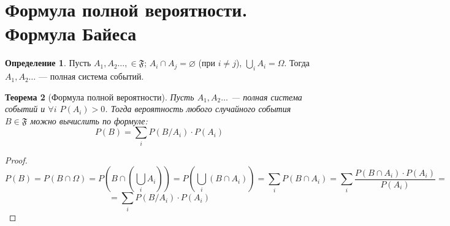 \documentclass[11pt,openany,a4paper]{scrartcl}
\theoremstyle{plain}
\newtheorem{theorem}{Теорема}[section]
\theoremstyle{definition}
\newtheorem{definition}[theorem]{Определение}
\begin{document}
\section{Формула полной вероятности. Формула Байеса}
\begin{definition}
    Пусть $A_1, A_2 \ldots, \in \mathfrak{F}$; $A_i \cap A_j = \varnothing$
    (при $i \neq j$), $\bigcup\limits_i A_i = \Omega$. Тогда $A_1, A_2 \ldots$ — полная
    система событий.
\end{definition}
\begin{theorem}[Формула полной вероятности]
    Пусть $A_1, A_2 \ldots$ — полная система событий и $\forall i$ $P(A_i) > 0$. Тогда
    вероятность любого случайного события $B \in \mathfrak{F}$ можно вычислить
    по формуле:
    $$
    P(B) = \sum_i P(B/A_i) \cdot P(A_i)
    $$
\end{theorem}
\begin{proof}
    $$
    P(B) = P(B \cap \Omega) = P(B \cap (\bigcup_i A_i)) = P(\bigcup_i (B \cap A_i)) =
    \sum_i P(B \cap A_i) = \sum_i\frac{P(B \cap A_i) \cdot P(A_i)}{P(A_i)} =
    $$
    $$
    = \sum_i P(B/A_i) \cdot P(A_i)
    $$
\end{proof}
\end{document}
